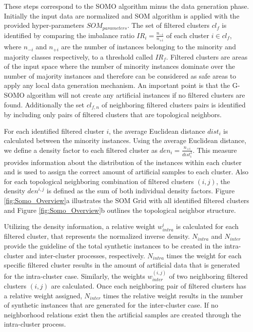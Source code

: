\documentclass[parskip=full]{scrartcl}
\begin{document}
These steps correspond to the SOMO algorithm minus the data generation phase.
Initially the input data are normalized and SOM algorithm is applied with the
provided hyper-parameters $SOM_{parameters}$. The set of filtered clusters $cl_{f}$ is identified by comparing the imbalance ratio $IR_{i} = \frac{n_{-i}}{n_{+i}}$ of each cluster $i \in cl_{f}$, where $n_{-i}$ and $n_{+i}$ are the number of instances belonging to the minority and majority classes respectively, to a threshold called $IR_{f}$. Filtered clusters are areas of the input space where the number of minority instances dominate over the number of majority instances and therefore can be considered as safe areas to apply any local data generation mechanism. An important point is that the G-SOMO algorithm will not create any artificial instances if no filtered clusters are found. Additionally the set $cl_{f, n}$ of neighboring filtered clusters pairs is identified by including only pairs of filtered clusters that are topological neighbors.

For each identified filtered cluster $i$, the average Euclidean distance $dist_{i}$ is calculated between the minority instances. Using the average Euclidean distance, we define a density factor to each filtered cluster as $den_{i} = \frac{n_{+i}}{dist_{i}^2}$. This measure provides information about the distribution of the instances within each cluster and is used to assign the correct amount of artificial samples to each cluster. Also for each topological neighboring combination of filtered clusters $(i, j)$, the density $den^{i, j}$ is defined as the sum of both individual density factors. Figure \ref{fig:Somo_Overview}a illustrates the SOM Grid with all identified filtered clusters and Figure \ref{fig:Somo_Overview}b outlines the topological neighbor structure.

Utilizing the density information, a relative weight $w^{i}_{intra}$ is calculated for each filtered cluster, that represents the normalized inverse density. $N_{intra}$ and $N_{inter}$ provide the guideline of the total synthetic instances to be created in the intra-cluster and inter-cluster processes, respectively. $N_{intra}$ times the weight for each specific filtered cluster results in the amount of artificial data that is generated for the intra-cluster case. Similarly, the weights $w^{(i, j)}_{inter}$ of two neighboring filtered clusters $(i, j)$ are calculated. Once each neighboring pair of filtered clusters has a relative weight assigned, $N_{inter}$ times the relative weight results in the number of synthetic instances that are generated for the inter-cluster case. If no neighborhood relations exist then the artificial samples are created through the intra-cluster process.
\end{document}
